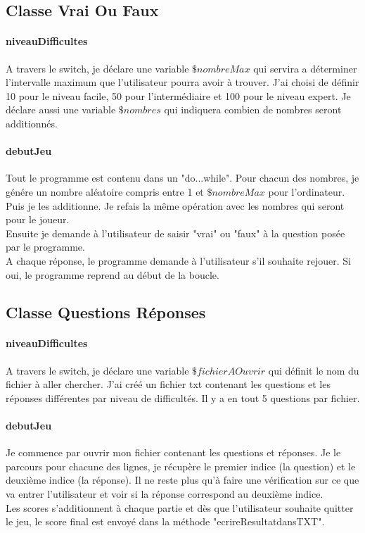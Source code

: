 \documentclass[10pt]{report}
\begin{document}
		\subsection{Classe Vrai Ou Faux}
			\paragraph{niveauDifficultes\\}
			A travers le switch, je déclare une variable $\$nombreMax$ qui servira a déterminer l'intervalle maximum que l'utilisateur pourra avoir à trouver. J'ai choisi de définir 10 pour le niveau facile, 50 pour l'intermédiaire et 100 pour le niveau expert. Je déclare aussi une variable $\$nombres$ qui indiquera combien de nombres seront additionnés.

			\paragraph{debutJeu\\}
			Tout le programme est contenu dans un "do...while". Pour chacun des nombres, je génére un nombre aléatoire compris entre 1 et $\$nombreMax$ pour l'ordinateur. Puis je les additionne. Je refais la même opération avec les nombres qui seront pour le joueur.\\
			Ensuite je demande à l'utilisateur de saisir "vrai" ou "faux" à la question posée par le programme.\\
			A chaque réponse, le programme demande à l'utilisateur s'il souhaite rejouer. Si oui, le programme reprend au début de la boucle.

		\subsection{Classe Questions Réponses}
			\paragraph{niveauDifficultes\\}
			A travers le switch, je déclare une variable $\$fichierAOuvrir$ qui définit le nom du fichier à aller chercher. J'ai créé un fichier txt contenant les questions et les réponses différentes par niveau de difficultés. Il y a en tout 5 questions par fichier.

			\paragraph{debutJeu\\}
			Je commence par ouvrir  mon fichier contenant les questions et réponses. Je le parcours pour chacune des lignes, je récupère le premier indice (la question) et le deuxième indice (la réponse).
			Il ne reste plus qu'à faire une vérification sur ce que va entrer l'utilisateur et voir si la réponse correspond au deuxième indice.\\
			Les scores s'additionnent à chaque partie et dès que l'utilisateur souhaite quitter le jeu, le score final est envoyé dans la méthode "ecrireResultatdansTXT".
\end{document}
